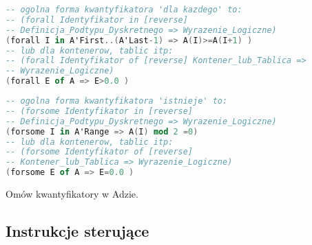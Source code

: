 \documentclass[a4paper,15pt]{article}
\newcommand{\ask}[2]{
    \begin{tcolorbox}[colback=black!5!white,colframe=gray,title={Pytanie #1}]
        #2
    \end{tcolorbox}
}
\begin{document}
\begin{lstlisting}[language=Ada, caption=Przyklad kwantyfikatorow 'dla kazdego']
-- ogolna forma kwantyfikatora 'dla kazdego' to:
-- (forall Identyfikator in [reverse] 
-- Definicja_Podtypu_Dyskretnego => Wyrazenie_Logiczne) 
(forall I in A'First..(A'Last-1) => A(I)>=A(I+1) )
-- lub dla kontenerow, tablic itp:
-- (forall Identyfikator of [reverse] Kontener_lub_Tablica =>
-- Wyrazenie_Logiczne) 
(forall E of A => E>0.0 )
\end{lstlisting}

\begin{lstlisting}[language=Ada, caption=Przyklad kwantyfikatorow 'istnieje']
-- ogolna forma kwantyfikatora 'istnieje' to:
-- (forsome Identyfikator in [reverse] 
-- Definicja_Podtypu_Dyskretnego => Wyrazenie_Logiczne) 
(forsome I in A'Range => A(I) mod 2 =0) 
-- lub dla kontenerow, tablic itp:
-- (forsome Identyfikator of [reverse] 
-- Kontener_lub_Tablica => Wyrazenie_Logiczne) 
(forsome E of A => E=0.0 )
\end{lstlisting}

\ask{}{
Omów kwantyfikatory w Adzie.
}


\subsection{Instrukcje sterujące}
\end{document}
